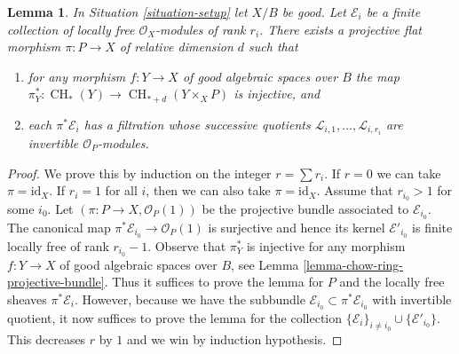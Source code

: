 \documentclass[10pt,a4paper]{amsart}
\theoremstyle{plain}
\newtheorem{lemma}[subsection]{Lemma}
\theoremstyle{definition}
\theoremstyle{remark}
\numberwithin{equation}{subsection}
\def\CH{\mathop{\mathrm{CH}}\nolimits}
\begin{document}
\begin{lemma}
\label{lemma-splitting-principle}
In Situation \ref{situation-setup} let $X/B$ be good.
Let $\mathcal{E}_i$ be a finite collection of locally free
$\mathcal{O}_X$-modules of rank $r_i$. There exists a projective
flat morphism $\pi : P \to X$ of relative dimension $d$ such that
\begin{enumerate}
\item for any morphism $f : Y \to X$ of good algebraic spaces
over $B$ the map
$\pi_Y^* : \CH_*(Y) \to \CH_{* + d}(Y \times_X P)$ is injective, and
\item each $\pi^*\mathcal{E}_i$ has a filtration
whose successive quotients $\mathcal{L}_{i, 1}, \ldots, \mathcal{L}_{i, r_i}$
are invertible ${\mathcal O}_P$-modules.
\end{enumerate}
\end{lemma}

\begin{proof}
We prove this by induction on the integer $r = \sum r_i$.
If $r = 0$ we can take $\pi = \text{id}_X$.
If $r_i = 1$ for all $i$, then we can also take $\pi = \text{id}_X$.
Assume that $r_{i_0} > 1$ for some $i_0$.
Let $(\pi : P \to X, \mathcal{O}_P(1))$
be the projective bundle associated to $\mathcal{E}_{i_0}$.
The canonical map $\pi^*\mathcal{E}_{i_0} \to \mathcal{O}_P(1)$
is surjective and hence its kernel $\mathcal{E}'_{i_0}$
is finite locally free of rank $r_{i_0} - 1$.
Observe that $\pi_Y^*$ is injective for any
morphism $f : Y \to X$ of good algebraic spaces
over $B$, see Lemma \ref{lemma-chow-ring-projective-bundle}.
Thus it suffices to prove the lemma for
$P$ and the locally free sheaves $\pi^*\mathcal{E}_i$.
However, because we have the subbundle
$\mathcal{E}_{i_0} \subset \pi^*\mathcal{E}_{i_0}$
with invertible quotient, it now suffices to prove
the lemma for the collection
$\{\mathcal{E}_i\}_{i \not = i_0} \cup \{\mathcal{E}'_{i_0}\}$.
This decreases $r$ by $1$ and we win by induction hypothesis.
\end{proof}
\end{document}
